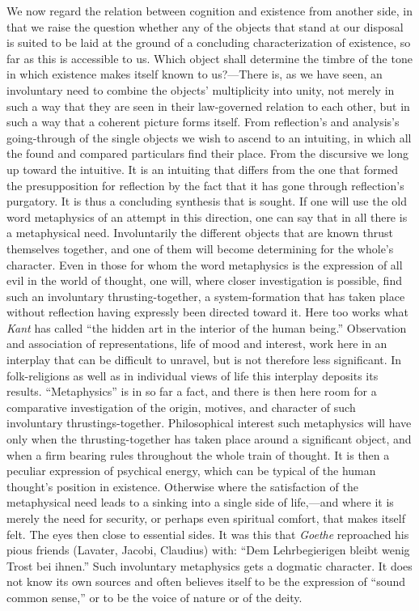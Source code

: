 \documentclass[12pt,a4paper]{book}
\newcommand{\opage}[1]{\marginnote{\footnotesize\textit{[#1]}}}
\begin{document}
We now regard the relation between cognition and existence from another side, in that we
raise the question whether any of the objects that stand at our disposal is suited to be
laid at the ground of a concluding characterization of existence, so far as this is
accessible to us. Which object shall determine the timbre of the tone in which existence
makes itself known to us?---There is, as we have seen, an involuntary need to combine the
objects' multiplicity into unity, not merely in such a way that they are seen in their
law-governed relation to each other, but in such a way that a coherent picture forms
itself. From reflection's and analysis's going-through of the single objects we wish to
ascend to an intuiting, in which all the found and compared particulars find their place.
From the discursive we long up toward the intuitive. It is an intuiting that differs from
the one that formed the presupposition for reflection \opage{307}by the fact that it has gone through
reflection's purgatory. It is thus a concluding synthesis that is sought. If one will use
the old word metaphysics of an attempt in this direction, one can say that in all there is
a metaphysical need. Involuntarily the different objects that are known thrust themselves
together, and one of them will become determining for the whole's character. Even in those
for whom the word metaphysics is the expression of all evil in the world of thought, one
will, where closer investigation is possible, find such an involuntary thrusting-together,
a system-formation that has taken place without reflection having expressly been directed
toward it. Here too works what \emph{Kant} has called ``the hidden art in the interior of
the human being.'' Observation and association of representations, life of mood and
interest, work here in an interplay that can be difficult to unravel, but is not therefore
less significant. In folk-religions as well as in individual views of life this interplay
deposits its results. ``Metaphysics'' is in so far a fact, and there is then here room for
a comparative investigation of the origin, motives, and character of such involuntary
thrustings-together. Philosophical interest such metaphysics will have only when the
thrusting-together has taken place around a significant object, and when a firm bearing
rules throughout the whole train of thought. It is then a peculiar expression of psychical
energy, which can be typical of the human thought's position in existence. Otherwise where
the satisfaction of the metaphysical need leads to a sinking into a single side of
life,---and where it is merely the need for security, or perhaps even spiritual comfort,
that makes itself felt. The eyes then close to essential sides. It was this that
\emph{Goethe} reproached his pious friends (Lavater, Jacobi, Claudius) with: ``Dem
Lehrbegierigen bleibt wenig Trost bei ihnen.'' Such involuntary metaphysics gets a
dogmatic character. It does not know its own sources and often believes itself to be the
expression of ``sound common sense,'' or to be the voice of nature or of the deity.
\end{document}
